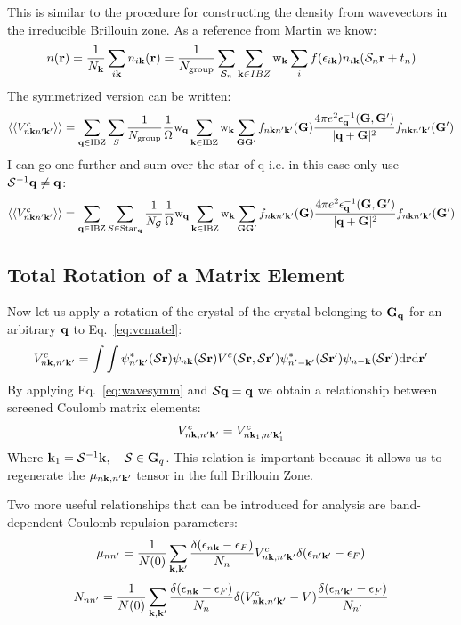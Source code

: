 \documentclass{article}
\def\r{{\bf r}}
\def\k{{\bf k}}
\def\q{{\bf q}}
\def\G{{\bf G}}
\def\S{\mathcal{S}}
\def\bra{\langle}
\def\ket{\rangle}
\def\Gs{\mathcal{G}}
\def\S{\mathcal{S}}
\def\Gs{\mathcal{G}}
\begin{document}
This is similar to the procedure for constructing 
the density from wavevectors in the irreducible 
Brillouin zone. As a reference from Martin we know:
%
\begin{equation}
\label{eq:symmdens}
n(\r) = \frac{1}{N_{\k}}\sum_{i\k}n_{i\k}(\r) = \frac{1}{N_{\rm group}}\sum_{\mathcal{S}_{n}}\sum_{\k\in IBZ}{\rm w}_{\k}\sum_{i}f(\epsilon_{i\k})n_{i\k}(\mathcal{S}_{n}\r + t_{n})
\end{equation}
%
The symmetrized version can be written:
%
\begin{equation}
\bra\bra V^{c}_{n\k n'\k'}\ket\ket=\sum_{\q\in{\rm IBZ}}\sum_{S}\frac{1}{N_{\rm group}}\frac{1}{\Omega}{\rm w}_{\q}\sum_{\k\in {\rm IBZ}}{\rm w}_{\k}\sum_{\G \G'} f_{n\k n'\k'}(\G)\frac{4\pi e^{2}\epsilon_{\q}^{-1}(\G,\G')}{|\q+\G|^{2}}f_{n\k n'\k'}(\G')
\end{equation}
%
I can go one further and sum over the star of q i.e. in this case only use $\S^{-1}\q \neq \q$:
%
\begin{equation}
\bra \bra V^{c}_{n\k n'\k'} \ket \ket = \sum_{\q\in{\rm IBZ}}\sum_{S\in{\rm Star_{\q}}}\frac{1}{N_{\Gs}}\frac{1}{\Omega}{\rm w}_{\q}\sum_{\k\in {\rm IBZ}}{\rm w}_{\k}\sum_{\G \G'}f_{n\k n'\k'}(\G)\frac{4\pi e^{2}\epsilon_{\q}^{-1}(\G,\G')}{|\q+\G|^{2}}f_{n\k n'\k'}(\G')
\end{equation}
%

\subsection{Total Rotation of a Matrix Element}
Now let us apply a rotation of the crystal of the crystal belonging to $\G_{\q}$ for
an arbitrary $\q$ to Eq.~\ref{eq:vcmatel}:
%
\begin{equation}
V^{c}_{n\k,n'\k'} = \int \int \psi^{*}_{n'\k'}(\S\r)\psi_{n\k}(\S\r)V^{c}(\S\r,\S\r')\psi^{*}_{n'-\k'}(\S\r')\psi_{n-\k}(\S\r')\rm{d}\r \rm{d}\r'
\end{equation}
%
By applying Eq.~\ref{eq:wavesymm} and $\S\q=\q$ we obtain a relationship between 
screened Coulomb matrix elements:
%
\begin{equation}
\label{eq:equivmatel}
V^{c}_{n\k,n'\k'} = V^{c}_{n\k_{1},n'\k'_{1}}
\end{equation}
%
Where $\k_{1}=\S^{-1}\k,\quad \S\in\G_{q}$. This relation is important because it allows us to regenerate
the $\mu_{n\k,n'\k'}$ tensor in the full Brillouin Zone.

Two more useful relationships that can be introduced for analysis are band-dependent 
Coulomb repulsion parameters:
%
\begin{equation}
\mu_{nn'} = \frac{1}{N(0)} \sum_{\k,\k'} \frac{\delta(\epsilon_{n\k}-\epsilon_{F})}{N_{n}}V^{c}_{n\k,n'\k'}\delta(\epsilon_{n'\k'}-\epsilon_{F})
\end{equation}
%
\begin{equation}
N_{nn'} = \frac{1}{N(0)} \sum_{\k,\k'}\frac{\delta(\epsilon_{n\k}-\epsilon_{F})}{N_{n}}
\delta(V^{c}_{n\k,n'\k'}-V) \frac{\delta(\epsilon_{n'\k'}-\epsilon_{F})}{N_{n'}}
\end{equation}
\end{document}
